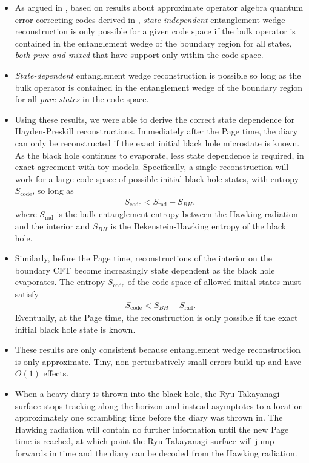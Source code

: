 \documentclass[11pt,a4paper]{article}
\newcommand{\Srad}{S_\text{rad} }
\begin{document}
\begin{itemize}
\item As argued in \cite{hayden2018learning}, based on results about approximate operator algebra quantum error correcting codes derived in \cite{beny2007generalization, beny2009conditions, beny2010general}, \emph{state-independent} entanglement wedge reconstruction is only possible for a given code space if the bulk operator is contained in the entanglement wedge of the boundary region for all states, \emph{both pure and mixed} that have support only within the code space.

\item \emph{State-dependent} entanglement wedge reconstruction is possible so long as the bulk operator is contained in the entanglement wedge of the boundary region for all \emph{pure states} in the code space.

\item Using these results, we were able to derive the correct state dependence for Hayden-Preskill reconstructions. Immediately after the Page time, the diary can only be reconstructed if the exact initial black hole microstate is known. As the black hole continues to evaporate, less state dependence is required, in exact agreement with toy models. Specifically, a single reconstruction will work for a large code space of possible initial black hole states, with entropy $S_\text{code}$, so long as
\begin{align}
S_\text{code} < \Srad - S_{BH},
\end{align}
where $\Srad$ is the bulk entanglement entropy between the Hawking radiation and the interior and $S_{BH}$ is the Bekenstein-Hawking entropy of the black hole.

\item Similarly, before the Page time, reconstructions of the interior on the boundary CFT become increasingly state dependent as the black hole evaporates. The entropy $S_\text{code}$ of the code space of allowed initial states must satisfy
\begin{align}
S_\text{code} < S_{BH} - \Srad.
\end{align}
Eventually, at the Page time, the reconstruction is only possible if the exact initial black hole state is known.

\item These results are only consistent because entanglement wedge reconstruction is only approximate. Tiny, non-perturbatively small errors build up and have $O(1)$ effects.

\item When a heavy diary is thrown into the black hole, the Ryu-Takayanagi surface stops tracking along the horizon and instead asymptotes to a location approximately one scrambling time before the diary was thrown in. The Hawking radiation will contain no further information until the new Page time is reached, at which point the Ryu-Takayanagi surface will jump forwards in time and the diary can be decoded from the Hawking radiation. 


\end{itemize}
\end{document}
